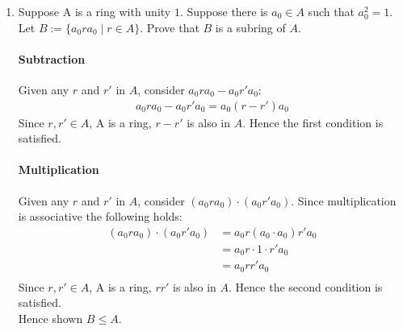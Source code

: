 \documentclass[12pt]{article}
\begin{document}
\begin{enumerate}
\begin{enumerate}
		\end{enumerate}
	
	\item Suppose A is a ring with unity $1$. Suppose there is $a_0 \in A$ such
		that $a^2_0 = 1$. Let $B:=\{a_0 r a_0 \mid r \in A\}$. Prove that $B$ is a
		subring of $A$.\\
		\paragraph{Subtraction}Given any $r$ and $r'$ in $A$, consider $a_0ra_0 -
		a_0r'a_0$:
		\begin{align*}
			a_0ra_0 - a_0r'a_0 = a_0(r-r')a_0
		\end{align*}
		Since $r, r' \in A$, A is a ring, $r-r'$ is also in $A$. Hence the first
		condition is satisfied.
		\paragraph{Multiplication}Given any $r$ and $r'$ in $A$, consider
		$(a_0ra_0) \cdot (a_0r'a_0)$. Since multiplication is associative the
		following holds:
		\begin{align*}
			(a_0ra_0) \cdot (a_0r'a_0) &= a_0r(a_0\cdot a_0)r'a_0 \\
																 &= a_0r\cdot 1 \cdot r'a_0 \\
																 &= a_0rr'a_0 \\
		\end{align*}
		Since $r, r' \in A$, A is a ring, $rr'$ is also in $A$. Hence the second
		condition is satisfied.\\
		Hence shown $B\le A$.

\end{enumerate}
\end{document}
